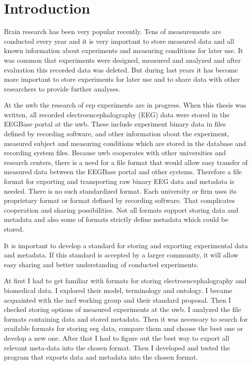\chapter {Introduction}

Brain research has been very popular recently. Tens of measurements are conducted every year and it is very important to store measured data and all known information about experiments and measuring conditions for later use. It was common that experiments were designed, measured and analyzed and after evaluation this recorded data was deleted. But during last years it has become more important to store experiments for later use and to share data with other researchers to provide further analyses.

At the \gls{uwb} the research of \gls{erp} experiments are  in progress. When this thesis was written, all recorded electroencephalography (EEG) data were stored in the EEGBase portal at the \gls{uwb}. These include experiment binary data in files defined by recording software, and other information about the experiment, measured subject and measuring conditions which are stored in the database and recording system files. Because \gls{uwb} cooperates with other universities and research centers, there is a need for a file format that would allow easy transfer of measured data between the EEGBase portal and other systems. Therefore a file format for exporting and transporting raw binary EEG data and metadata is needed. There is no such standardized format. Each university or firm uses its proprietary format or format defined by recording software. That complicates cooperation and sharing possibilities. Not all formats support storing data and metadata and also some of formats strictly define metadata which could be stored.

It is important to develop a standard for storing and exporting experimental data and metadata. If this standard is accepted by a larger community, it will allow easy sharing and better understanding of conducted experiments.

At first I had to get familiar with formats for storing electroencephalography and biomedical data. I explored their model, terminology and ontology. I became acquainted with the \gls{incf} working group and their standard proposal. Then I checked storing options of measured experiments at the \gls{uwb}. I analyzed the file formats containing data and stored metadata. Then it was necessary to search for available formats for storing \gls{eeg} data, compare them and choose the best one or develop a new one. After that I had to figure out the best way to export all relevant meta-data into the chosen format. Then I developed and tested the program that exports data and metadata into the chosen format.
